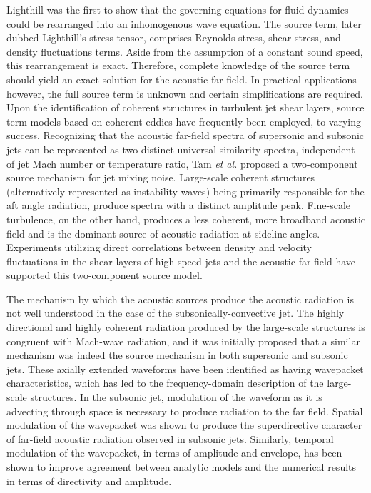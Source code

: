 \documentclass[english]{aiaa-tc}
\begin{document}
 Lighthill\cite{lighthill1963} was the first to show that the governing equations for fluid dynamics could be rearranged into an inhomogenous wave equation. The source term, later dubbed Lighthill's stress tensor, comprises Reynolds stress, shear stress, and density fluctuations terms. Aside from the assumption of a constant sound speed, this rearrangement is exact. Therefore, complete knowledge of the source term should yield an exact solution for the acoustic far-field. In practical applications however, the full source term is unknown and certain simplifications are required. Upon the identification of coherent structures in turbulent jet shear layers\cite{Arndt1997,Mollo-Christensen1967,crow1971,bgl74-1 }, source term models based on coherent eddies have frequently been employed, to varying success. Recognizing that the acoustic far-field spectra of supersonic and subsonic jets can be represented as two distinct universal similarity spectra, independent of jet Mach number or temperature ratio, Tam {\em et al.}\cite{Tam1996} proposed a two-component source mechanism for jet mixing noise. Large-scale coherent structures (alternatively represented as instability waves) being primarily responsible for the aft angle radiation, produce spectra with a distinct amplitude peak. Fine-scale turbulence, on the other hand,  produces a less coherent, more broadband acoustic field and is the dominant source of acoustic radiation at sideline angles. Experiments utilizing direct correlations between density and velocity fluctuations in the shear layers of high-speed jets and the acoustic far-field have supported this two-component source model\cite{Panda2002,Panda2005b}. 
 
The mechanism by which the acoustic sources produce the acoustic radiation is not well understood in the case of the subsonically-convective jet. The highly directional and highly coherent radiation produced by the large-scale structures is congruent with Mach-wave radiation, and it was initially proposed that a similar mechanism was indeed the source mechanism in both supersonic and subsonic jets\cite{Tam2008}. These axially extended waveforms have been identified as having wavepacket characteristics\cite{JorColo2013}, which has led to the frequency-domain description of the large-scale structures. In the subsonic jet, modulation of the waveform as it is advecting through space is necessary to produce radiation to the far field. Spatial modulation of the wavepacket was shown to produce the superdirective character of far-field acoustic radiation observed in subsonic jets\cite{Crighton1990}. Similarly, temporal modulation of the wavepacket, in terms of amplitude and envelope, has been shown to improve agreement between analytic models and the numerical results in terms of directivity and amplitude\cite{Sandham2006,Cavalieri2010}. 
\end{document}
